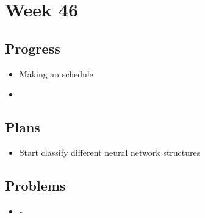 \section*{Week 46}
    \subsection*{Progress}
        \begin{itemize}
            \item Making an schedule
            \item 
        \end{itemize}
        
    \subsection*{Plans}
        \begin{itemize}
            \item Start classify different neural network structures
        \end{itemize}
    
    \subsection*{Problems}
        \begin{itemize}
            \item -
        \end{itemize}